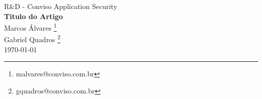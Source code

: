 \begin{center}

R\&D - Conviso Application Security\\[0.5cm]
{\large \textbf{Titulo do Artigo} }\\[0.5cm]

Marcos Álvares \footnote{malvares@conviso.com.br}\\Gabriel Quadros \footnote{gquadros@conviso.com.br}\\[0.2cm]

\today


\end{center}

